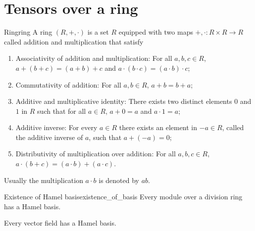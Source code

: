 \section{Tensors over a ring}

\begin{definition}{Ring}{ring}
    A ring \((R, +, \cdot)\) is a set \(R\) equipped with two maps \(+, \cdot : R \times R \to R\) called addition and multiplication that satisfy
    \begin{enumerate}[label=(\alph*)]
        \item Associativity of addition and multiplication: For all \(a,b,c \in R\), \(a + (b + c) = (a + b) + c\) and \(a \cdot (b\cdot c) = (a\cdot b) \cdot c\);
        \item Commutativity of addition: For all \(a,b \in R\), \(a + b = b + a\);
        \item Additive and multiplicative identity: There exists two distinct elements \(0\) and \(1\) in \(R\) such that for all \(a \in R\), \(a + 0 = a\) and \(a \cdot 1 = a\);
        \item Additive inverse: For every \(a \in R\) there exists an element in \(-a \in R\), called the additive inverse of \(a\), such that \(a + (-a) = 0\);
        \item Distributivity of multiplication over addition: For all \(a, b, c \in R\), \(a \cdot (b + c) = (a \cdot b) + (a\cdot c)\).
    \end{enumerate}
    Usually the multiplication \(a \cdot b\) is denoted by \(ab\).
\end{definition}

\begin{theorem}{Existence of Hamel basis}{existence_of_basis}
    Every module over a division ring has a Hamel basis.
\end{theorem}
\begin{corollary}
    Every vector field has a Hamel basis.
\end{corollary}
